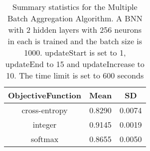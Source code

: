 \begin{center}
\begin{table}[H]
\centering
\begin{tabular}{|c|c|c|}
  \hline
ObjectiveFunction & Mean & SD \\ 
  \hline
cross-entropy & 0.8290 & 0.0074 \\ 
   \hline
integer & 0.9145 & 0.0019 \\ 
   \hline
softmax & 0.8655 & 0.0050 \\ 
   \hline
\end{tabular}
\caption{Summary statistics for the Multiple Batch Aggregation Algorithm. A BNN with 2 hidden layers with
          256 neurons in each is trained and the batch size is 1000. updateStart is set to 1, updateEnd to 15
          and updateIncrease to 10. The time limit is set to 600 seconds} 
\label{MBAA_OBJ}
\end{table}

\end{center}
